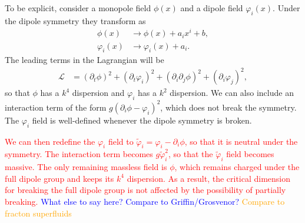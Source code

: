 \documentclass[pra,aps,twocolumn, amsfonts,amsmath,amssymb,nofootinbib,superscriptaddress]{revtex4-2}
\newcommand{\note}[1]{\textcolor{red}{#1}}
\newcommand{\todo}[1]{\textcolor{orange}{#1}}
\newcommand{\charlie}[1]{\textcolor{Blue}{#1}}
\newcommand{\nn}{\nonumber\\}
\newcommand{\goesto}{\rightarrow}
\renewcommand{\max}{\text{max}}
\begin{document}

To be explicit, consider a monopole field $\phi(x)$ and a dipole field $\varphi_i(x)$. Under the dipole symmetry they transform as 
\begin{align}
\phi(x) &\goesto \phi(x) + a_ix^i + b,\nn
\varphi_i(x) &\goesto \varphi_i(x) + a_i.
\end{align}
The leading terms in the Lagrangian will be
\begin{align}
\mathcal{L} &= (\partial_t \phi)^2 + (\partial_t \varphi_i)^2 + (\partial_i \partial_j \phi)^2 + (\partial_i \varphi_j)^2,
\end{align}
so that $\phi$ has a $k^4$ dispersion and $\varphi_i$ has a $k^2$ dispersion. We can also include an interaction term of the form $g(\partial_i \phi - \varphi_i)^2$, which does not break the symmetry.  The $\varphi_i$ field is well-defined whenever the dipole symmetry is broken.

\note{We can then redefine the $\varphi_i$ field to $\tilde{\varphi}_i = \varphi_i - \partial_i \phi$, so that it is neutral under the symmetry. The interaction term becomes $g\tilde{\varphi}_i^2$, so that the $\tilde{\varphi}_i$ field becomes massive. The only remaining massless field is $\phi$, which remains charged under the full dipole group and keeps its $k^4$ dispersion. As a result, the critical dimension for breaking the full dipole group is not affected by the possibility of partially breaking.
}
\charlie{What else to say here? Compare to Griffin/Grosvenor?}
\todo{Compare to fracton superfluids}


\end{document}
